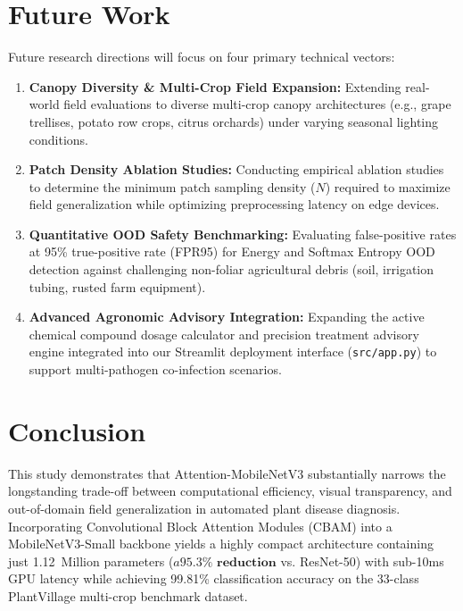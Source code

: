 \documentclass[conference]{IEEEtran}
\begin{document}
\section{Future Work}
\label{sec:future_work}
Future research directions will focus on four primary technical vectors:
\begin{enumerate}
    \item \textbf{Canopy Diversity \& Multi-Crop Field Expansion:} Extending real-world field evaluations to diverse multi-crop canopy architectures (e.g., grape trellises, potato row crops, citrus orchards) under varying seasonal lighting conditions.
    \item \textbf{Patch Density Ablation Studies:} Conducting empirical ablation studies to determine the minimum patch sampling density ($N$) required to maximize field generalization while optimizing preprocessing latency on edge devices.
    \item \textbf{Quantitative OOD Safety Benchmarking:} Evaluating false-positive rates at 95\% true-positive rate (FPR95) for Energy and Softmax Entropy OOD detection against challenging non-foliar agricultural debris (soil, irrigation tubing, rusted farm equipment).
    \item \textbf{Advanced Agronomic Advisory Integration:} Expanding the active chemical compound dosage calculator and precision treatment advisory engine integrated into our Streamlit deployment interface (\texttt{src/app.py}) to support multi-pathogen co-infection scenarios.
\end{enumerate}

\section{Conclusion}
\label{sec:conclusion}
This study demonstrates that \mbox{Attention-MobileNetV3} substantially narrows the longstanding trade-off between computational efficiency, visual transparency, and out-of-domain field generalization in automated plant disease diagnosis. Incorporating Convolutional Block Attention Modules (CBAM) into a MobileNetV3-Small backbone yields a highly compact architecture containing just 1.12~Million parameters ($a \mathbf{95.3\% \text{ reduction}}$ vs. ResNet-50) with sub-10ms GPU latency while achieving 99.81\% classification accuracy on the 33-class PlantVillage multi-crop benchmark dataset. 
\end{document}
